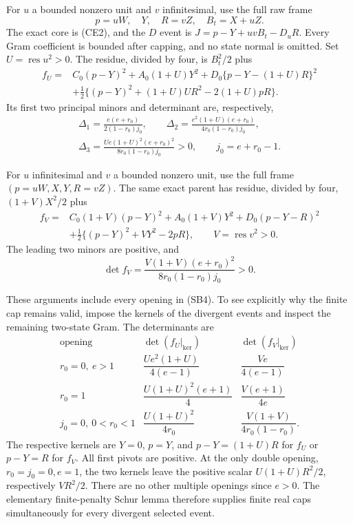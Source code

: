 For $u$ a bounded nonzero unit and $v$ infinitesimal, use the full
raw frame
\[
 p=uW,\quad Y,\quad R=vZ,\quad B_t=X+uZ.
\]
The exact core is (CE2), and the $D$ event is
$J=p-Y+uvB_t-D_uR$. Every Gram coefficient is bounded after
capping, and no state normal is omitted. Set $U=\operatorname{res}u^2>0$.
The residue, divided by four, is $B_t^2/2$ plus
\[
\begin{split}
 f_U={}&C_0(p-Y)^2+A_0(1+U)Y^2
       +D_0\{p-Y-(1+U)R\}^2\\
 &+\tfrac12\{(p-Y)^2+(1+U)UR^2-2(1+U)pR\}.
\end{split}                                            \tag{SB6}
\]
Its first two principal minors and determinant are, respectively,
\[
\begin{gathered}
\Delta_1=\frac{e(e+r_0)}{2(1-r_0)j_0},\qquad
\Delta_2=\frac{e^2(1+U)(e+r_0)}{4r_0(1-r_0)j_0},\\
\Delta_3=\frac{Ue(1+U)^2(e+r_0)^2}{8r_0(1-r_0)j_0}>0,
\qquad j_0=e+r_0-1.
\end{gathered}                                      \tag{SB7}
\]

For $u$ infinitesimal and $v$ a bounded nonzero unit, use the full
frame $(p=uW,X,Y,R=vZ)$. The same exact parent has residue,
divided by four, $(1+V)X^2/2$ plus
\[
\begin{split}
 f_V={}&C_0(1+V)(p-Y)^2+A_0(1+V)Y^2
       +D_0(p-Y-R)^2\\
       &+\tfrac12\{(p-Y)^2+VY^2-2pR\},
 \qquad V=\operatorname{res}v^2>0.
\end{split}                                            \tag{SB8}
\]
The leading two minors are positive, and
\[
 \det f_V=\frac{V(1+V)(e+r_0)^2}{8r_0(1-r_0)j_0}>0. \tag{SB9}
\]

These arguments include every opening in (SB4). To see explicitly
why the finite cap remains valid, impose the kernels of the divergent
events and inspect the remaining two-state Gram. The determinants
are
\[
\renewcommand{\arraystretch}{1.7}
\begin{array}{c|c|c}
\text{opening}&\det(f_U|_{\ker})&\det(f_V|_{\ker})\\\hline
r_0=0,\ e>1&\dfrac{Ue^2(1+U)}{4(e-1)}&\dfrac{Ve}{4(e-1)}\\
r_0=1&\dfrac{U(1+U)^2(e+1)}4&\dfrac{V(e+1)}{4e}\\
j_0=0,\ 0<r_0<1&
 \dfrac{U(1+U)^2}{4r_0}&\dfrac{V(1+V)}{4r_0(1-r_0)}.
\end{array}                                                   \tag{SB10}
\]
The respective kernels are $Y=0$, $p=Y$, and
$p-Y=(1+U)R$ for $f_U$ or $p-Y=R$ for $f_V$.
All first pivots are positive. At the only double opening,
$r_0=j_0=0,e=1$, the two kernels leave the positive scalar
$U(1+U)R^2/2$, respectively $VR^2/2$. There are no other
multiple openings since $e>0$. The elementary finite-penalty
Schur lemma therefore supplies finite real caps simultaneously
for every divergent selected event.

